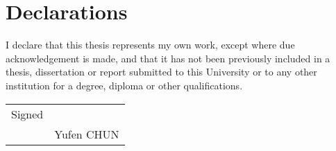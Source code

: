 

%
%


\chapter*{Declarations}

I declare that this thesis represents my own work, except where due acknowledgement is made, and that it has not been previously included in a thesis, dissertation or report submitted to this University or to any other institution for a degree, diploma or other qualifications.%

\bigskip
\bigskip
\bigskip
\bigskip
\bigskip
\bigskip
\bigskip
\bigskip

\begin{flushright}
    \begin{tabular}{p{1cm} p{4cm}}
        Signed & \dotfill \\
           & \center Yufen CHUN\\
    \end{tabular}
\end{flushright}

\bigskip
\bigskip
\bigskip